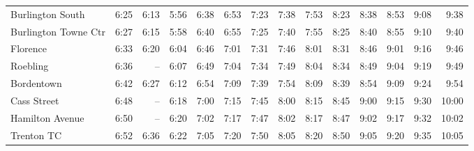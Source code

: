 \begin{center}
\begin{tabular}{@{}lrrrrrrrrrrrrr@{}}
Burlington South & 6:25 & 6:13 & 5:56 & 6:38 & 6:53 & 7:23 & 7:38 & 7:53 & 8:23 & 8:38 & 8:53 & 9:08 & 9:38 \\
Burlington Towne Ctr & 6:27 & 6:15 & 5:58 & 6:40 & 6:55 & 7:25 & 7:40 & 7:55 & 8:25 & 8:40 & 8:55 & 9:10 & 9:40 \\
Florence & 6:33 & 6:20 & 6:04 & 6:46 & 7:01 & 7:31 & 7:46 & 8:01 & 8:31 & 8:46 & 9:01 & 9:16 & 9:46 \\
Roebling & 6:36 & -- & 6:07 & 6:49 & 7:04 & 7:34 & 7:49 & 8:04 & 8:34 & 8:49 & 9:04 & 9:19 & 9:49 \\
Bordentown & 6:42 & 6:27 & 6:12 & 6:54 & 7:09 & 7:39 & 7:54 & 8:09 & 8:39 & 8:54 & 9:09 & 9:24 & 9:54 \\
Cass Street & 6:48 & -- & 6:18 & 7:00 & 7:15 & 7:45 & 8:00 & 8:15 & 8:45 & 9:00 & 9:15 & 9:30 & 10:00 \\
Hamilton Avenue & 6:50 & -- & 6:20 & 7:02 & 7:17 & 7:47 & 8:02 & 8:17 & 8:47 & 9:02 & 9:17 & 9:32 & 10:02 \\
Trenton TC & 6:52 & 6:36 & 6:22 & 7:05 & 7:20 & 7:50 & 8:05 & 8:20 & 8:50 & 9:05 & 9:20 & 9:35 & 10:05 \\
\bottomrule\end{tabular}\end{center}
